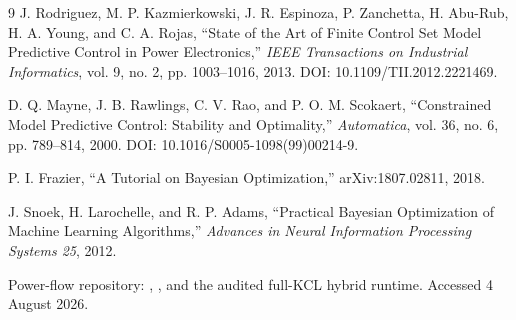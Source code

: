 \documentclass[12pt,a4paper]{article}
\begin{document}
\begin{thebibliography}{9}
J. Rodriguez, M. P. Kazmierkowski, J. R. Espinoza, P. Zanchetta, H. Abu-Rub,
H. A. Young, and C. A. Rojas,
``State of the Art of Finite Control Set Model Predictive Control in Power Electronics,''
\emph{IEEE Transactions on Industrial Informatics}, vol. 9, no. 2, pp. 1003--1016, 2013.
DOI: 10.1109/TII.2012.2221469.

D. Q. Mayne, J. B. Rawlings, C. V. Rao, and P. O. M. Scokaert,
``Constrained Model Predictive Control: Stability and Optimality,''
\emph{Automatica}, vol. 36, no. 6, pp. 789--814, 2000.
DOI: 10.1016/S0005-1098(99)00214-9.

P. I. Frazier, ``A Tutorial on Bayesian Optimization,'' arXiv:1807.02811, 2018.

J. Snoek, H. Larochelle, and R. P. Adams,
``Practical Bayesian Optimization of Machine Learning Algorithms,''
\emph{Advances in Neural Information Processing Systems 25}, 2012.

Power-flow repository: ,
, and the audited full-KCL hybrid runtime.
Accessed 4 August 2026.
\end{thebibliography}
\end{document}
